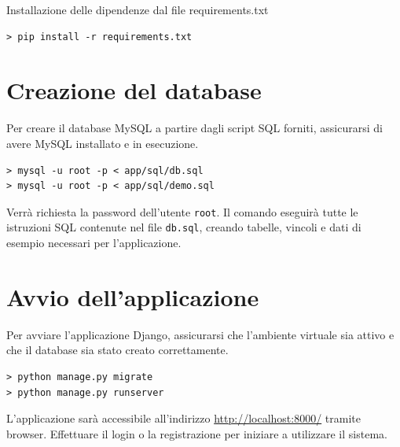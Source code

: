 \documentclass[a4paper,12pt]{report}
\begin{document}
\noindent Installazione delle dipendenze dal file requirements.txt
\begin{verbatim}
> pip install -r requirements.txt
\end{verbatim}

\section{Creazione del database}

Per creare il database MySQL a partire dagli script SQL forniti, assicurarsi di avere MySQL
installato e in esecuzione.

\begin{verbatim}
> mysql -u root -p < app/sql/db.sql
> mysql -u root -p < app/sql/demo.sql
\end{verbatim}

Verrà richiesta la password dell'utente \texttt{root}. Il comando eseguirà tutte le
istruzioni SQL contenute nel file \texttt{db.sql}, creando tabelle, vincoli e dati di
esempio necessari per l'applicazione.

\section{Avvio dell'applicazione}

Per avviare l'applicazione Django, assicurarsi che l'ambiente virtuale sia attivo e che il database
sia stato creato correttamente.

\begin{verbatim}
> python manage.py migrate
> python manage.py runserver
\end{verbatim}

L'applicazione sarà accessibile all'indirizzo \url{http://localhost:8000/} tramite browser. Effettuare
il login o la registrazione per iniziare a utilizzare il sistema.
\end{document}

